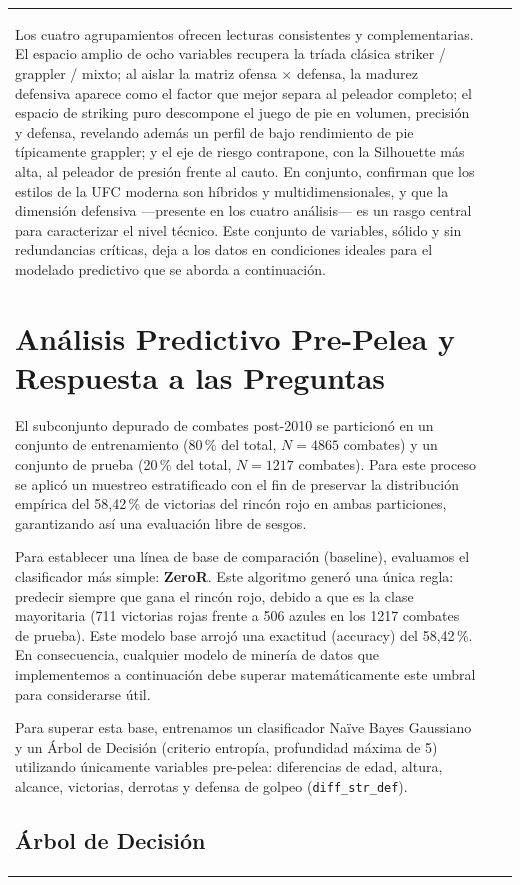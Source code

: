 \documentclass[11pt,a4paper]{article}
\begin{document}
\begin{longtable}{>{\raggedright\arraybackslash}p{5.6cm}>{\raggedright\arraybackslash}p{1.3cm}>{\raggedright\arraybackslash}p{5.1cm}}
Los cuatro agrupamientos ofrecen lecturas consistentes y complementarias. El espacio amplio de ocho variables recupera la tríada clásica striker / grappler / mixto; al aislar la matriz ofensa $\times$ defensa, la madurez defensiva aparece como el factor que mejor separa al peleador completo; el espacio de striking puro descompone el juego de pie en volumen, precisión y defensa, revelando además un perfil de bajo rendimiento de pie típicamente grappler; y el eje de riesgo contrapone, con la Silhouette más alta, al peleador de presión frente al cauto. En conjunto, confirman que los estilos de la UFC moderna son híbridos y multidimensionales, y que la dimensión defensiva —presente en los cuatro análisis— es un rasgo central para caracterizar el nivel técnico. Este conjunto de variables, sólido y sin redundancias críticas, deja a los datos en condiciones ideales para el modelado predictivo que se aborda a continuación.

\pagebreak
\section{Análisis Predictivo Pre-Pelea y Respuesta a las Preguntas}

El subconjunto depurado de combates post-2010 se particionó en un conjunto de entrenamiento (80\,\% del total, $N = 4865$ combates) y un conjunto de prueba (20\,\% del total, $N = 1217$ combates). Para este proceso se aplicó un muestreo estratificado con el fin de preservar la distribución empírica del 58,42\,\% de victorias del rincón rojo en ambas particiones, garantizando así una evaluación libre de sesgos.

Para establecer una línea de base de comparación (baseline), evaluamos el clasificador más simple: \textbf{ZeroR}. Este algoritmo generó una única regla: predecir siempre que gana el rincón rojo, debido a que es la clase mayoritaria (711 victorias rojas frente a 506 azules en los 1217 combates de prueba). Este modelo base arrojó una exactitud (accuracy) del 58,42\,\%. En consecuencia, cualquier modelo de minería de datos que implementemos a continuación debe superar matemáticamente este umbral para considerarse útil.

Para superar esta base, entrenamos un clasificador Naïve Bayes Gaussiano y un Árbol de Decisión (criterio entropía, profundidad máxima de 5) utilizando únicamente variables pre-pelea: diferencias de edad, altura, alcance, victorias, derrotas y defensa de golpeo (\texttt{diff\_str\_def}).

\subsection{Árbol de Decisión}


\end{longtable}
\end{document}
